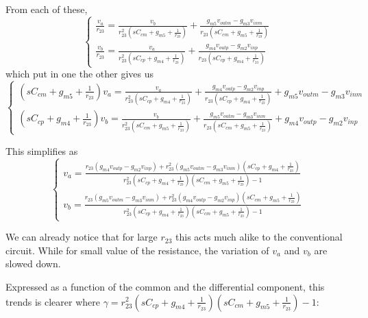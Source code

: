 From each of these, \[
\begin{cases}
    \frac{v_a}{r_{23}} = \frac{v_{b}}{r_{23}^2\left(sC_{cm}+g_{m5}+\frac{1}{r_{23}}\right)} + \frac{g_{m5}v_{outm} - g_{m3}v_{inm}}{r_{23}\left(sC_{cm}+g_{m5}+\frac{1}{r_{23}}\right)} \\
    \frac{v_b}{r_{23}} = \frac{v_{a}}{r_{23}^2\left(sC_{cp}+g_{m4}+\frac{1}{r_{23}}\right)} + \frac{g_{m4}v_{outp} - g_{m2}v_{inp}}{r_{23}\left(sC_{cp}+g_{m4}+\frac{1}{r_{23}}\right)}
\end{cases}
\]
which put in one the other gives us \[
\begin{cases}
    \left(sC_{cm}+g_{m5}+\frac{1}{r_{23}}\right)v_a = \frac{v_{a}}{r_{23}^2\left(sC_{cp}+g_{m4}+\frac{1}{r_{23}}\right)} + \frac{g_{m4}v_{outp} - g_{m2}v_{inp}}{r_{23}\left(sC_{cp}+g_{m4}+\frac{1}{r_{23}}\right)} + g_{m5}v_{outm} - g_{m3}v_{inm}  \\
    \left(sC_{cp}+g_{m4}+\frac{1}{r_{23}}\right)v_b = \frac{v_{b}}{r_{23}^2\left(sC_{cm}+g_{m5}+\frac{1}{r_{23}}\right)} + \frac{g_{m5}v_{outm} - g_{m3}v_{inm}}{r_{23}\left(sC_{cm}+g_{m5}+\frac{1}{r_{23}}\right)} + g_{m4}v_{outp} - g_{m2}v_{inp}
\end{cases}
\]

This simplifies as \[
\begin{cases}
v_a = \frac{r_{23}\left(g_{m4}v_{outp}-g_{m2}v_{inp}\right)+r_{23}^2\left(g_{m5}v_{outm}-g_{m3}v_{inm}\right)\left(sC_{cp}+g_{m4}+\frac{1}{r_{23}}\right)}{r_{23}^2\left(sC_{cp}+g_{m4}+\frac{1}{r_{23}}\right)\left(sC_{cm}+g_{m5}+\frac{1}{r_{23}}\right)-1} \\
v_b = \frac{r_{23}\left(g_{m5}v_{outm}-g_{m3}v_{inm}\right)+r_{23}^2\left(g_{m4}v_{outp}-g_{m2}v_{inp}\right)\left(sC_{cm}+g_{m5}+\frac{1}{r_{23}}\right)}{r_{23}^2\left(sC_{cp}+g_{m4}+\frac{1}{r_{23}}\right)\left(sC_{cm}+g_{m5}+\frac{1}{r_{23}}\right)-1}
\end{cases}
\]

We can already notice that for large \(r_{23}\) this acts much alike to the conventional circuit. While for small value of the resistance, the variation of \(v_a\) and \(v_b\) are slowed down.

Expressed as a function of the common and the differential component, this trends is clearer where \(\gamma = r_{23}^2\left(sC_{cp}+g_{m4}+\frac{1}{r_{23}}\right)\left(sC_{cm}+g_{m5}+\frac{1}{r_{23}}\right)-1\):

